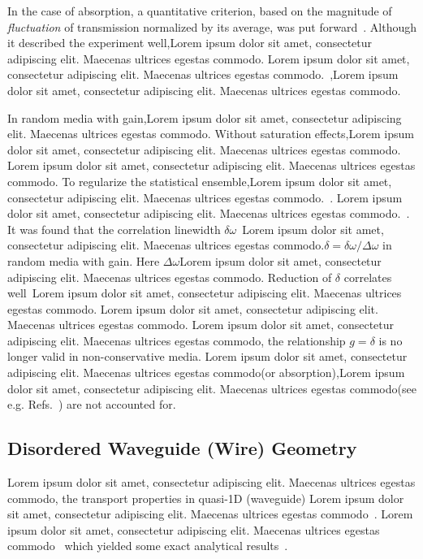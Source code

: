 In the case of absorption, a quantitative criterion, based on the magnitude of {\it fluctuation} of transmission normalized by its average, was put forward~\cite{2000_chabanov_nature}. Although it described the experiment well,Lorem ipsum dolor sit amet, consectetur adipiscing elit. Maecenas ultrices egestas commodo. Lorem ipsum dolor sit amet, consectetur adipiscing elit. Maecenas ultrices egestas commodo.~\cite{1994_Freilikher_absorption},Lorem ipsum dolor sit amet, consectetur adipiscing elit. Maecenas ultrices egestas commodo. 

In random media with gain,Lorem ipsum dolor sit amet, consectetur adipiscing elit. Maecenas ultrices egestas commodo. Without saturation effects,Lorem ipsum dolor sit amet, consectetur adipiscing elit. Maecenas ultrices egestas commodo. Lorem ipsum dolor sit amet, consectetur adipiscing elit. Maecenas ultrices egestas commodo. To regularize the statistical ensemble,Lorem ipsum dolor sit amet, consectetur adipiscing elit. Maecenas ultrices egestas commodo.~\cite{2005_Yamilov_correlations}. Lorem ipsum dolor sit amet, consectetur adipiscing elit. Maecenas ultrices egestas commodo.~\cite{2004_Yamilov_intensity,2006_Yamilov_conductance,2005_Yamilov_correlations}. It was found that the correlation linewidth $\delta\omega$~\cite{2000_Sebbah}Lorem ipsum dolor sit amet, consectetur adipiscing elit. Maecenas ultrices egestas commodo.$\delta=\delta\omega/\Delta\omega$ in random media with gain. Here $\Delta\omega$Lorem ipsum dolor sit amet, consectetur adipiscing elit. Maecenas ultrices egestas commodo.  Reduction of $\delta$ correlates well~\cite{2005_Yamilov_correlations}Lorem ipsum dolor sit amet, consectetur adipiscing elit. Maecenas ultrices egestas commodo. Lorem ipsum dolor sit amet, consectetur adipiscing elit. Maecenas ultrices egestas commodo. Lorem ipsum dolor sit amet, consectetur adipiscing elit. Maecenas ultrices egestas commodo, the relationship $g=\delta$ is no longer valid in non-conservative media. Lorem ipsum dolor sit amet, consectetur adipiscing elit. Maecenas ultrices egestas commodo(or absorption),Lorem ipsum dolor sit amet, consectetur adipiscing elit. Maecenas ultrices egestas commodo(see e.g. Refs.~\cite{1999_Patra_noise,2009_Skipetrov_noise}) are not accounted for.

\subsection{Disordered Waveguide (Wire) Geometry}

Lorem ipsum dolor sit amet, consectetur adipiscing elit. Maecenas ultrices egestas commodo, the transport properties in quasi-1D (waveguide) Lorem ipsum dolor sit amet, consectetur adipiscing elit. Maecenas ultrices egestas commodo~\cite{1997_Beenakker}. Lorem ipsum dolor sit amet, consectetur adipiscing elit. Maecenas ultrices egestas commodo~\cite{2004_Mello_Kumar_book} which yielded some exact analytical results~\cite{1994_Beenakker_exact,2000_Mirlin}.

